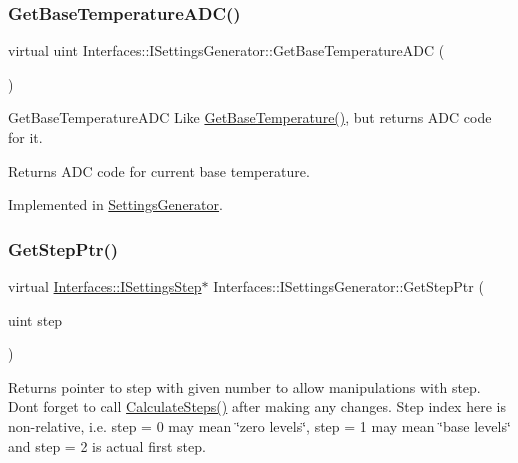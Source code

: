 \subsubsection{\texorpdfstring{Get\+Base\+Temperature\+A\+D\+C()}{GetBaseTemperatureADC()}}
{\footnotesize\ttfamily virtual uint Interfaces\+::\+I\+Settings\+Generator\+::\+Get\+Base\+Temperature\+A\+DC (\begin{DoxyParamCaption}{ }\end{DoxyParamCaption})\hspace{0.3cm}{\ttfamily [pure virtual]}}



Get\+Base\+Temperature\+A\+DC Like \hyperlink{class_interfaces_1_1_i_settings_generator_a9cc36185b446f21e09a0e5633f39a1c5}{Get\+Base\+Temperature()}, but returns A\+DC code for it. 

\begin{DoxyReturn}{Returns}
A\+DC code for current base temperature. 
\end{DoxyReturn}


Implemented in \hyperlink{class_settings_generator_a5f3f78597f001c127b89f6447a46df09}{Settings\+Generator}.

\mbox{\label{class_interfaces_1_1_i_settings_generator_af1b65a18c3ade3235715ae2e9cdbcfe0}} 
\subsubsection{\texorpdfstring{Get\+Step\+Ptr()}{GetStepPtr()}}
{\footnotesize\ttfamily virtual \hyperlink{class_interfaces_1_1_i_settings_step}{Interfaces\+::\+I\+Settings\+Step}$\ast$ Interfaces\+::\+I\+Settings\+Generator\+::\+Get\+Step\+Ptr (\begin{DoxyParamCaption}\item[{uint}]{step }\end{DoxyParamCaption})\hspace{0.3cm}{\ttfamily [pure virtual]}}



Returns pointer to step with given number to allow manipulations with step. Don\textquotesingle{}t forget to call \hyperlink{class_interfaces_1_1_i_settings_generator_a7788522bb5d25bfd8b8af430512ec5f5}{Calculate\+Steps()} after making any changes. Step index here is non-\/relative, i.\+e. step = 0 may mean \char`\"{}zero levels\char`\"{}, step = 1 may mean \char`\"{}base levels\char`\"{} and step = 2 is actual first step. 



